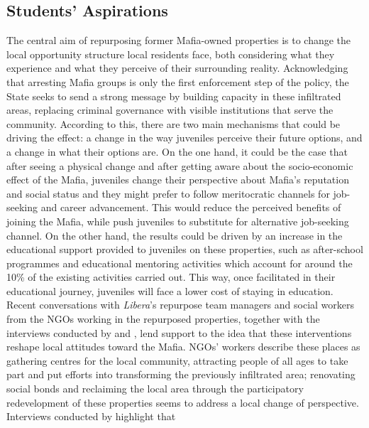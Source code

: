 \documentclass[12pt]{article}
\theoremstyle{plain}
\theoremstyle{plain}
\theoremstyle{plain}
\theoremstyle{definition}
\theoremstyle{plain}
\theoremstyle{definition}
\theoremstyle{plain}
\theoremstyle{remark}
\theoremstyle{definition}
\theoremstyle{definition}
\theoremstyle{plain}
\begin{document}
\subsection{Students' Aspirations}
\label{sec:jmp_perception}
The central aim of repurposing former Mafia-owned properties is to change the local opportunity structure local residents face, both considering what they experience and what they perceive of their surrounding reality. Acknowledging that arresting Mafia groups is only the first enforcement step of the policy, the State seeks to send a strong message by building capacity in these infiltrated areas, replacing criminal governance with visible institutions that serve the community. According to this, there are two main mechanisms that could be driving the effect: a change in the way juveniles perceive their future options, and a change in what their options are. On the one hand, it could be the case that after seeing a physical change and after getting aware about the socio-economic effect of the Mafia, juveniles change their perspective about Mafia's reputation and social status and they might prefer to follow meritocratic channels for job-seeking and career advancement. This would reduce the perceived benefits of joining the Mafia, while push juveniles to substitute for alternative job-seeking channel. On the other hand, the results could be driven by an increase in the educational support provided to juveniles on these properties, such as after-school programmes and educational mentoring activities which account for around the 10\% of the existing activities carried out. This way, once facilitated in their educational journey, juveniles will face a lower cost of staying in education. \\

Recent conversations with \emph{Libera}'s repurpose team managers and social workers from the NGOs working in the repurposed properties, together with the interviews conducted by \citet{nazzaro_il_2021} and \citet{falcone_beneitalia_2016}, lend support to the idea that these interventions reshape local attitudes toward the Mafia. NGOs' workers describe these places as gathering centres for the local community, attracting people of all ages to take part and put efforts into transforming the previously infiltrated area; renovating social bonds and reclaiming the local area through the participatory redevelopment of these properties seems to address a local change of perspective. \\
Interviews conducted by \citet{nazzaro_il_2021} highlight that \par
\end{document}
